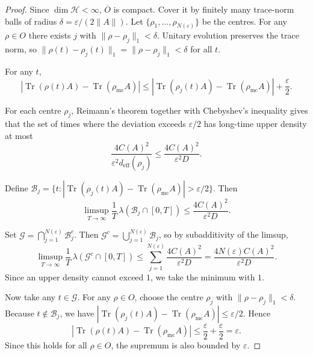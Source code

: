 \documentclass[11pt, onecolumn]{article}
\begin{document}
\begin{proof}
Since \(\dim\mathcal{H}<\infty\), \(\overline{O}\) is compact. Cover it by finitely many trace-norm balls of radius \(\delta = \varepsilon/(2\|A\|)\). Let \(\{\rho_1,\dots,\rho_{N(\varepsilon)}\}\) be the centres. For any \(\rho\in O\) there exists \(j\) with \(\|\rho-\rho_j\|_1<\delta\). Unitary evolution preserves the trace norm, so \(\|\rho(t)-\rho_j(t)\|_1 = \|\rho-\rho_j\|_1 < \delta\) for all \(t\).

For any \(t\),
\[
|\operatorname{Tr}(\rho(t)A)-\operatorname{Tr}(\rho_{\mathrm{mc}}A)|
\le |\operatorname{Tr}(\rho_j(t)A)-\operatorname{Tr}(\rho_{\mathrm{mc}}A)| + \frac{\varepsilon}{2}.
\]

For each centre \(\rho_j\), Reimann's theorem together with Chebyshev's inequality gives that the set of times where the deviation exceeds \(\varepsilon/2\) has long-time upper density at most
\[
\frac{4C(A)^2}{\varepsilon^2 d_{\mathrm{eff}}(\rho_j)} \le \frac{4C(A)^2}{\varepsilon^2 D}.
\]

Define \(\mathcal{B}_j = \{ t : |\operatorname{Tr}(\rho_j(t)A)-\operatorname{Tr}(\rho_{\mathrm{mc}}A)| > \varepsilon/2 \}\). Then
\[
\limsup_{T\to\infty}\frac{1}{T}\,\lambda(\mathcal{B}_j\cap[0,T]) \le \frac{4C(A)^2}{\varepsilon^2 D}.
\]

Set \(\mathcal{G} = \bigcap_{j=1}^{N(\varepsilon)} \mathcal{B}_j^c\). Then \(\mathcal{G}^c = \bigcup_{j=1}^{N(\varepsilon)} \mathcal{B}_j\), so by subadditivity of the limsup,
\[
\limsup_{T\to\infty}\frac{1}{T}\,\lambda(\mathcal{G}^c\cap[0,T]) \le \sum_{j=1}^{N(\varepsilon)} \frac{4C(A)^2}{\varepsilon^2 D}
= \frac{4N(\varepsilon) C(A)^2}{\varepsilon^2 D}.
\]
Since an upper density cannot exceed \(1\), we take the minimum with \(1\).

Now take any \(t\in\mathcal{G}\). For any \(\rho\in O\), choose the centre \(\rho_j\) with \(\|\rho-\rho_j\|_1<\delta\). Because \(t\notin\mathcal{B}_j\), we have \(|\operatorname{Tr}(\rho_j(t)A)-\operatorname{Tr}(\rho_{\mathrm{mc}}A)|\le \varepsilon/2\). Hence
\[
|\operatorname{Tr}(\rho(t)A)-\operatorname{Tr}(\rho_{\mathrm{mc}}A)|
\le \frac{\varepsilon}{2} + \frac{\varepsilon}{2} = \varepsilon.
\]
Since this holds for all \(\rho\in O\), the supremum is also bounded by \(\varepsilon\). 
\end{proof}
\end{document}
